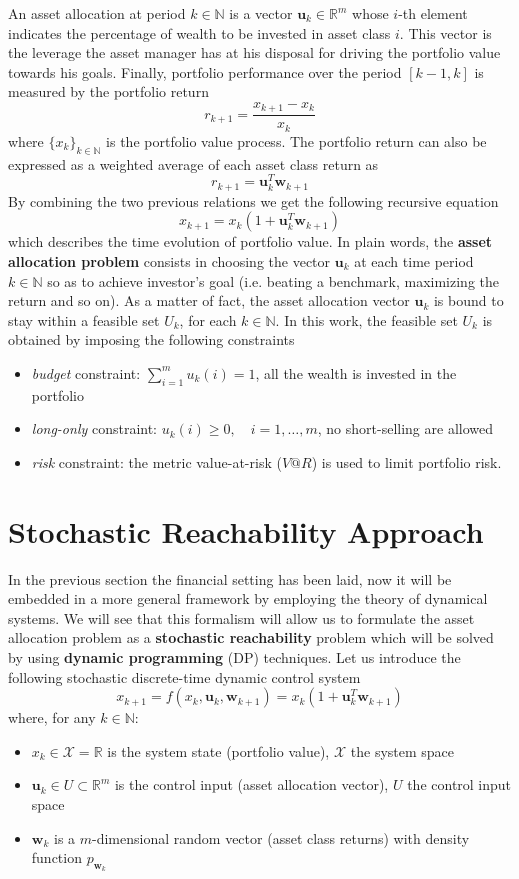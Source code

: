 An asset allocation at period $k \in \mathbb{N}$ is a vector $\bm{u}_k \in \mathbb{R}^m$ whose $i$-th element indicates the percentage of wealth to be invested in asset class $i$. This vector is the leverage the asset manager has at his disposal for driving the portfolio value towards his goals. Finally, portfolio performance over the period $[k-1,k]$ is measured by the portfolio return $$r_{k+1}=\frac{x_{k+1}-x_{k}}{x_k}$$ where $\{x_k\}_{k \in \mathbb{N}}$ is the portfolio value process. The portfolio return can also be expressed as a weighted average of each asset class return  as $$ r_{k+1} = \bm{u}_k^T \bm{w}_{k+1}$$
 By combining the two previous relations we get the following recursive equation 
 \begin{equation}
 \boxed{x_{k+1} = x_k (1 + \bm{u}_k^T \bm{w}_{k+1})}
 \end{equation}
 which describes the time evolution of portfolio value. In plain words, the \textbf{asset allocation problem} consists in choosing the vector $\bm{u}_k$ at each time period $k \in \mathbb{N}$ so as to achieve investor's goal (i.e. beating a benchmark, maximizing the return and so on). As a matter of fact, the asset allocation vector $\bm{u}_k$ is bound to stay within a feasible set $U_k$, for each $k \in \mathbb{N}$. In this work, the feasible set $U_k$ is obtained by imposing the following constraints
 \begin{itemize}
 	\item \textit{budget} constraint: $\sum_{i=1}^{m}u_k(i)=1$, all the wealth is invested in the portfolio
 	\item \textit{long-only} constraint: $u_k(i) \geq 0,\quad i = 1,\ldots,m$, no short-selling are allowed
 	\item \textit{risk} constraint: the metric value-at-risk ($V@R$) is used to limit portfolio risk. 
 \end{itemize}

\section{Stochastic Reachability Approach}
In the previous section the financial setting has been laid, now it will be embedded in a more general framework by employing the theory of dynamical systems. We will see that this formalism will allow us to formulate the asset allocation problem as a \textbf{stochastic reachability} problem which will be solved by using \textbf{dynamic programming} (DP) techniques. Let us introduce the following stochastic discrete-time dynamic control system $$x_{k+1} = f(x_k,\bm{u}_k,\bm{w}_{k+1}) = x_k (1 + \bm{u}_k^T \bm{w}_{k+1})$$ where, for any $k \in \mathbb{N}$:
\begin{itemize}
	\item $x_k \in \mathcal{X} = \mathbb{R}$ is the system state (portfolio value), $\mathcal{X}$ the system space
	\item $\bm{u}_k \in U \subset \mathbb{R}^m$ is the control input (asset allocation vector), $U$ the control input space
	\item $\bm{w}_{k}$ is a $m$-dimensional random vector (asset class returns) with density function $p_{\bm{w}_k}$
\end{itemize}

